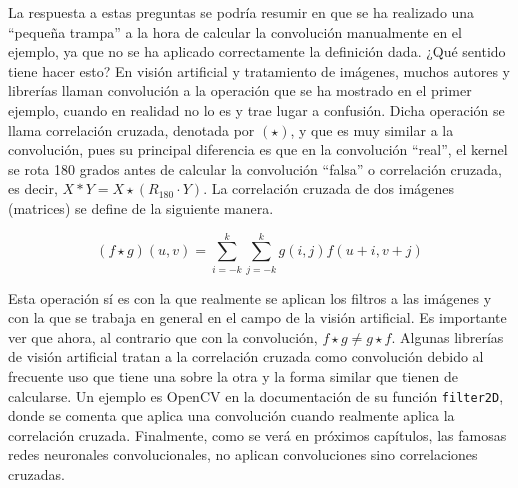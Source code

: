 		La respuesta a estas preguntas se podría resumir en que se ha realizado una ``pequeña trampa'' a la hora de calcular la convolución manualmente en el ejemplo, ya que no se ha aplicado correctamente la definición dada. ¿Qué sentido tiene hacer esto? En visión artificial y tratamiento de imágenes, muchos autores y librerías llaman convolución a la operación que se ha mostrado en el primer ejemplo, cuando en realidad no lo es y trae lugar a confusión. Dicha operación se llama correlación cruzada, denotada por $(\star)$, y que es muy similar a la convolución, pues su principal diferencia es que en la convolución ``real'', el kernel se rota 180 grados antes de calcular la convolución ``falsa'' o correlación cruzada, es decir, $X \ast Y = X \star (R_{180} \cdot Y)$. La correlación cruzada de dos imágenes (matrices) se define de la siguiente manera. 
		
		$$
		(f \star g)(u, v) = \sum_{i=-k}^{k}\sum_{j=-k}^{k} g(i, j)f(u + i, v + j)
		$$
		
		Esta operación sí es con la que realmente se aplican los filtros a las imágenes y con la que se trabaja en general en el campo de la visión artificial. Es importante ver que ahora, al contrario que con la convolución, $f \star g \neq g \star f$. Algunas librerías de visión artificial tratan a la correlación cruzada como convolución debido al frecuente uso que tiene una sobre la otra y la forma similar que tienen de calcularse. Un ejemplo es OpenCV en la documentación de su función \texttt{filter2D}, donde se comenta que aplica una convolución cuando realmente aplica la correlación cruzada. Finalmente, como se verá en próximos capítulos, las famosas redes neuronales convolucionales, no aplican convoluciones sino correlaciones cruzadas. 